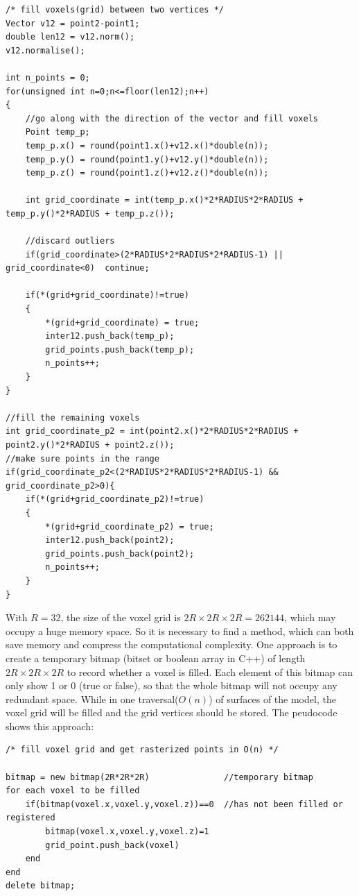 \begin{lstlisting}[xleftmargin=1em]
/* fill voxels(grid) between two vertices */
Vector v12 = point2-point1;
double len12 = v12.norm();
v12.normalise();

int n_points = 0;
for(unsigned int n=0;n<=floor(len12);n++)
{
    //go along with the direction of the vector and fill voxels
	Point temp_p;
	temp_p.x() = round(point1.x()+v12.x()*double(n));
	temp_p.y() = round(point1.y()+v12.y()*double(n));
	temp_p.z() = round(point1.z()+v12.z()*double(n));

	int grid_coordinate	= int(temp_p.x()*2*RADIUS*2*RADIUS + temp_p.y()*2*RADIUS + temp_p.z());

	//discard outliers
	if(grid_coordinate>(2*RADIUS*2*RADIUS*2*RADIUS-1) || grid_coordinate<0)  continue; 

	if(*(grid+grid_coordinate)!=true)
	{
		*(grid+grid_coordinate) = true;
		inter12.push_back(temp_p);
		grid_points.push_back(temp_p);
		n_points++;
	}
}

//fill the remaining voxels
int grid_coordinate_p2 = int(point2.x()*2*RADIUS*2*RADIUS + point2.y()*2*RADIUS + point2.z());
//make sure points in the range
if(grid_coordinate_p2<(2*RADIUS*2*RADIUS*2*RADIUS-1) && grid_coordinate_p2>0){
	if(*(grid+grid_coordinate_p2)!=true)
	{
		*(grid+grid_coordinate_p2) = true;
		inter12.push_back(point2);
		grid_points.push_back(point2);
		n_points++;
	} 
}
\end{lstlisting}

With $R = 32$, the size of the voxel grid is $2R\times2R\times2R = 262144$, which may occupy a huge memory space. So it is necessary to find a method, which can both save memory and compress the computational complexity. One approach is to create a temporary bitmap (bitset or boolean array in C++) of length $2R\times2R\times2R$ to record whether a voxel is filled. Each element of this bitmap can only show 1 or 0 (true or false), so that the whole bitmap will not occupy any redundant space. While in one traversal($O(n)$) of surfaces of the model, the voxel grid will be filled and the grid vertices should be stored. The peudocode shows this approach: 

\begin{lstlisting}[xleftmargin=1em]
/* fill voxel grid and get rasterized points in O(n) */

bitmap = new bitmap(2R*2R*2R)               //temporary bitmap
for each voxel to be filled
    if(bitmap(voxel.x,voxel.y,voxel.z))==0  //has not been filled or registered
        bitmap(voxel.x,voxel.y,voxel.z)=1
        grid_point.push_back(voxel)
    end
end
delete bitmap;
\end{lstlisting}

